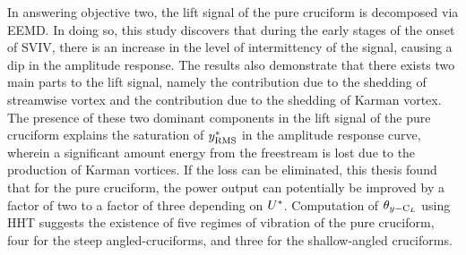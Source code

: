 \documentclass[oneside]{utmthesis}
\begin{document}

In answering objective two, the lift signal of the pure cruciform is decomposed via EEMD. In doing so, this study discovers that during the early stages of the onset of SVIV, there is an increase in the level of intermittency of the signal, causing a dip in the amplitude response. The results also demonstrate that there exists two main parts to the lift signal, namely the contribution due to the shedding of streamwise vortex and the contribution due to the shedding of Karman vortex. The presence of these two dominant components in the lift signal of the pure cruciform explains the saturation of $y^{*}_{\text{RMS}}$ in the amplitude response curve, wherein a significant amount energy from the freestream is lost due to the production of Karman vortices. If the loss can be eliminated, this thesis found that for the pure cruciform, the power output can potentially be improved by a factor of two to a factor of three depending on $U^{*}$. Computation of $\theta_{y-\text{C}_{L}}$ using HHT suggests the existence of five regimes of vibration of the pure cruciform, four for the steep angled-cruciforms, and three for the shallow-angled cruciforms.



\end{document}
